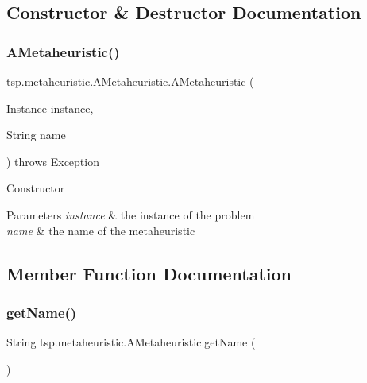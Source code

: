 \subsection{Constructor \& Destructor Documentation}
\mbox{\label{classtsp_1_1metaheuristic_1_1_a_metaheuristic_a8a5f85f47ae51d4e389c3335f5c32350}} 
\subsubsection{\texorpdfstring{A\+Metaheuristic()}{AMetaheuristic()}}
{\footnotesize\ttfamily tsp.\+metaheuristic.\+A\+Metaheuristic.\+A\+Metaheuristic (\begin{DoxyParamCaption}\item[{\mbox{\hyperlink{classtsp_1_1_instance}{Instance}}}]{instance,  }\item[{String}]{name }\end{DoxyParamCaption}) throws Exception\hspace{0.3cm}{\ttfamily [inline]}}

Constructor 
\begin{DoxyParams}{Parameters}
{\em instance} & the instance of the problem \\
\hline
{\em name} & the name of the metaheuristic \\
\hline
\end{DoxyParams}


\subsection{Member Function Documentation}
\mbox{\label{classtsp_1_1metaheuristic_1_1_a_metaheuristic_af6a576aa8c6e48ebd22ea5d02cf7e1d6}} 
\subsubsection{\texorpdfstring{get\+Name()}{getName()}}
{\footnotesize\ttfamily String tsp.\+metaheuristic.\+A\+Metaheuristic.\+get\+Name (\begin{DoxyParamCaption}{ }\end{DoxyParamCaption})\hspace{0.3cm}{\ttfamily [inline]}}

